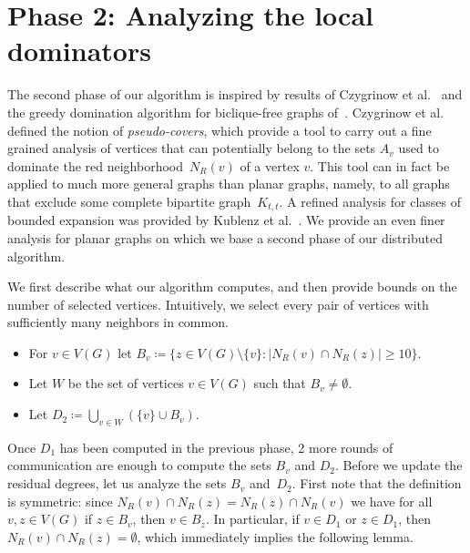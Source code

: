 

\section{Phase 2: Analyzing the local dominators}\label{sec:D2}

The second phase of our algorithm is inspired by results of Czygrinow
et al.~\cite{czygrinow2018distributed} and the greedy domination
algorithm for biclique-free graphs of~\cite{siebertz2019greedy}.
Czygrinow et al.~\cite{czygrinow2018distributed} defined the notion of
\emph{pseudo-covers}, which provide a tool to carry out a fine grained
analysis of vertices that can potentially belong to the sets $A_v$
used to dominate the red neighborhood~$N_R(v)$ of a vertex $v$. This
tool can in fact be applied to much more general graphs than planar
graphs, namely, to all graphs that exclude some complete bipartite
graph~$K_{t,t}$.  A refined analysis for classes of bounded expansion
was provided by Kublenz et al.~\cite{kublenz2020distributed}.  We
provide an even finer analysis for planar graphs on which we base a
second phase of our distributed algorithm.

We first describe what our algorithm computes, and then provide bounds
on the number of selected vertices. Intuitively, we select every pair
of vertices with sufficiently many neighbors in common.

\begin{tcolorbox}[colback=red!5!white,colframe=red!50!black]
\begin{itemize}
\item For $v\in V(G)$ let
  $B_v\coloneqq \{z\in V(G)\setminus \{v\}: |N_R(v)\cap N_R(z)|\geq
  10\}$.\smallskip
\item Let $W$ be the set of vertices $v\in V(G)$ such that
  $B_v \neq \emptyset$.\smallskip
\item Let $D_2\coloneqq \bigcup\limits_{v\in W} (\{v\}\cup B_v)$.
\end{itemize}
\end{tcolorbox}

Once $D_1$ has been computed in the previous phase, 2 more rounds of
communication are enough to compute the sets $B_v$ and $D_2$.
%
Before we update the residual degrees, let us analyze the sets $B_v$
and~$D_2$.  First note that the definition is symmetric: since
$N_R(v)\cap N_R(z)=N_R(z)\cap N_R(v)$ we have for all $v,z\in V(G)$ if
$z\in B_v$, then $v\in B_z$. In particular, if $v\in D_1$ or
$z\in D_1$, then $N_R(v)\cap N_R(z)=\emptyset$, which immediately
implies the following lemma.

